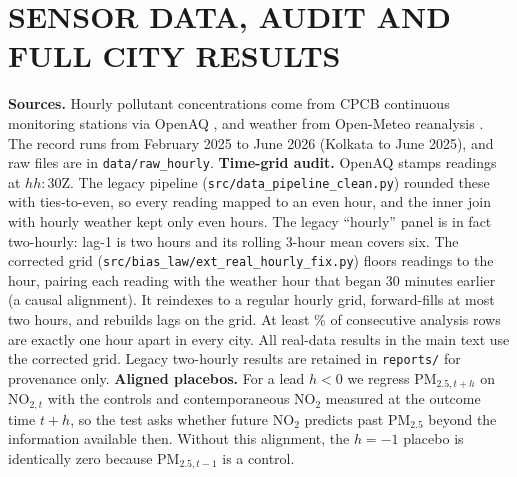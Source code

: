 \section{SENSOR DATA, AUDIT AND FULL CITY RESULTS}
\label{app:provenance}
\textbf{Sources.} Hourly pollutant concentrations come from CPCB continuous monitoring stations via OpenAQ \citep{openaq2025,cpcb2025}, and weather from Open-Meteo reanalysis \citep{openmeteo2025}. The record runs from February 2025 to June 2026 (Kolkata to June 2025), and raw files are in \texttt{data/raw\_hourly}.
\textbf{Time-grid audit.} OpenAQ stamps readings at $hh{:}30$Z. The legacy pipeline (\texttt{src/data\_pipeline\_clean.py}) rounded these with ties-to-even, so every reading mapped to an even hour, and the inner join with hourly weather kept only even hours. The legacy ``hourly'' panel is in fact two-hourly: lag-1 is two hours and its rolling 3-hour mean covers six. The corrected grid (\texttt{src/bias\_law/ext\_real\_hourly\_fix.py}) floors readings to the hour, pairing each reading with the weather hour that began 30 minutes earlier (a causal alignment). It reindexes to a regular hourly grid, forward-fills at most two hours, and rebuilds lags on the grid. At least \AuHourlyMin\% of consecutive analysis rows are exactly one hour apart in every city. All real-data results in the main text use the corrected grid. Legacy two-hourly results are retained in \texttt{reports/} for provenance only.
\textbf{Aligned placebos.} For a lead $h<0$ we regress PM$_{2.5,t+h}$ on NO$_{2,t}$ with the controls and contemporaneous NO$_2$ measured at the outcome time $t+h$, so the test asks whether future NO$_2$ predicts past PM$_{2.5}$ beyond the information available then. Without this alignment, the $h=-1$ placebo is identically zero because PM$_{2.5,t-1}$ is a control.
\begin{table}[h]\centering\scriptsize\setlength{\tabcolsep}{3pt}
\caption{Dynamic responses and lead placebos by horizon (hours; ATE, $^{*}$: $p<0.05$; \texttt{reports/synthesis/city\_placebo\_hourly.csv}). Delhi's response peaks at \PlDelhiPeak\ at $h=\PlDelhiPeakH$\,h, but its one-hour lead rejects, so we do not interpret the curve causally.}\label{tab:placebo}

\end{table}
\begin{table}[h]\centering\scriptsize\setlength{\tabcolsep}{3pt}
\caption{Newey--West lag sensitivity of regime-specific OR-DML with posterior-adjusted nuisances (corrected grid, frozen-sensor screen; \texttt{reports/bias\_law/e6\_hac\_lag\_sensitivity.csv}).}\label{tab:hac}

\end{table}
\begin{table}[h]\centering\footnotesize
\caption{Sensitivity analysis on the corrected hourly grid (posterior-feature estimate, 90\% block-bootstrap intervals; \texttt{reports/bias\_law/x23\_real\_hourly\_fix.csv}).}\label{tab:bstar}

\end{table}

